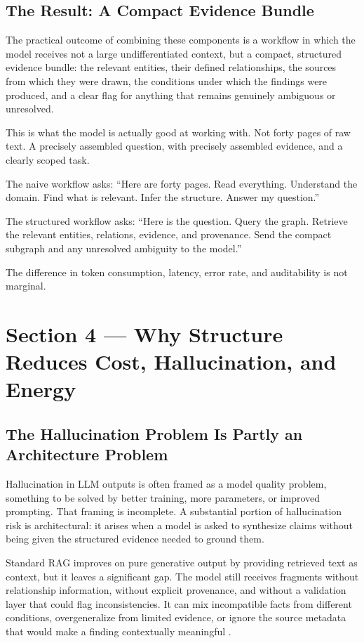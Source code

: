 \documentclass[man,12pt,donotrepeattitle]{apa7}
\begin{document}
\subsection{The Result: A Compact Evidence Bundle}

The practical outcome of combining these components is a workflow in which
the model receives not a large undifferentiated context, but a compact,
structured evidence bundle: the relevant entities, their defined
relationships, the sources from which they were drawn, the conditions under
which the findings were produced, and a clear flag for anything that remains
genuinely ambiguous or unresolved.

This is what the model is actually good at working with. Not forty pages of
raw text. A precisely assembled question, with precisely assembled evidence,
and a clearly scoped task.

The naive workflow asks: ``Here are forty pages. Read everything. Understand
the domain. Find what is relevant. Infer the structure. Answer my
question.''

The structured workflow asks: ``Here is the question. Query the graph.
Retrieve the relevant entities, relations, evidence, and provenance. Send
the compact subgraph and any unresolved ambiguity to the model.''

The difference in token consumption, latency, error rate, and auditability
is not marginal.


\section{Section 4 --- Why Structure Reduces Cost, Hallucination, and Energy}

\subsection{The Hallucination Problem Is Partly an Architecture Problem}

Hallucination in LLM outputs is often framed as a model quality problem,
something to be solved by better training, more parameters, or improved
prompting. That framing is incomplete. A substantial portion of
hallucination risk is architectural: it arises when a model is asked to
synthesize claims without being given the structured evidence needed to
ground them.

Standard RAG improves on pure generative output by providing retrieved text
as context, but it leaves a significant gap. The model still receives
fragments without relationship information, without explicit provenance, and
without a validation layer that could flag inconsistencies. It can mix
incompatible facts from different conditions, overgeneralize from limited
evidence, or ignore the source metadata that would make a finding
contextually meaningful \parencite{lavrinovics2024}.
\end{document}
